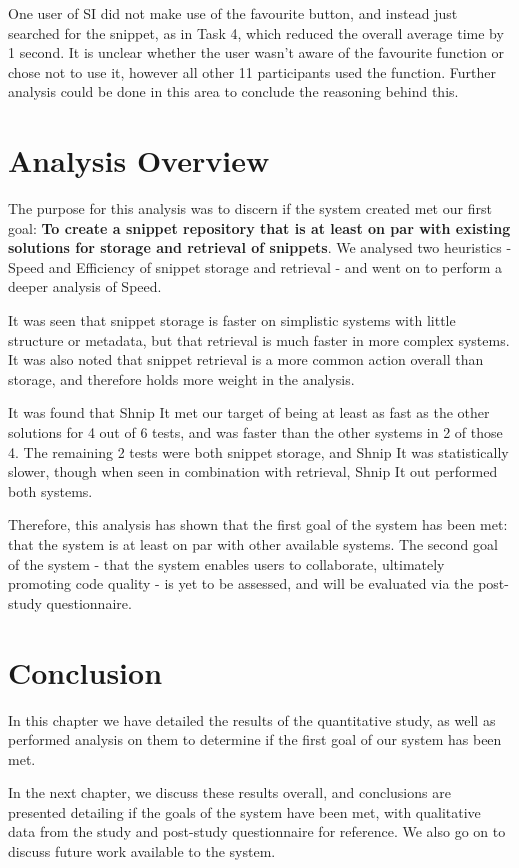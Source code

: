 One user of SI did not make use of the favourite button, and instead just searched for the snippet, as in Task 4, which reduced the overall average time by 1 second.
It is unclear whether the user wasn't aware of the favourite function or chose not to use it, however all other 11 participants used the function. 
Further analysis could be done in this area to conclude the reasoning behind this.

\section{Analysis Overview}
The purpose for this analysis was to discern if the system created met our first goal: \textbf{To create a snippet repository that is at least on par with existing solutions for storage and retrieval of snippets}.
We analysed two heuristics - Speed and Efficiency of snippet storage and retrieval - and went on to perform a deeper analysis of Speed.

It was seen that snippet storage is faster on simplistic systems with little structure or metadata, but that retrieval is much faster in more complex systems.
It was also noted that snippet retrieval is a more common action overall than storage, and therefore holds more weight in the analysis.

It was found that Shnip It met our target of being at least as fast as the other solutions for 4 out of 6 tests, and was faster than the other systems in 2 of those 4.
The remaining 2 tests were both snippet storage, and Shnip It was statistically slower, though when seen in combination with retrieval, Shnip It out performed both systems.

Therefore, this analysis has shown that the first goal of the system has been met: that the system is at least on par with other available systems.
The second goal of the system - that the system enables users to collaborate, ultimately promoting code quality - is yet to be assessed, and will be evaluated via the post-study questionnaire.

\section{Conclusion}
In this chapter we have detailed the results of the quantitative study, as well as performed analysis on them to determine if the first goal of our system has been met.

In the next chapter, we discuss these results overall, and conclusions are presented detailing if the goals of the system have been met, with qualitative data from the study and post-study questionnaire for reference.
We also go on to discuss future work available to the system.


 


